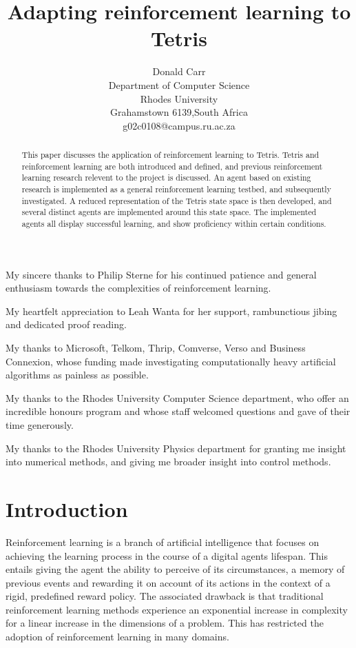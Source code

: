 \documentclass{rucsthesis}
\title{Adapting reinforcement learning to Tetris}
\author{Donald Carr \\ Department of Computer Science \\ Rhodes University \\ Grahamstown 6139,South Africa \\ g02c0108@campus.ru.ac.za}
\begin{document}
\maketitle

\begin{abstract}

This paper discusses the application of reinforcement learning to Tetris. Tetris and reinforcement learning are both introduced and defined, and previous reinforcement learning research relevent to the project is discussed. An agent based on existing research is implemented as a general reinforcement learning testbed, and subsequently investigated. A reduced representation of the Tetris state space is then developed, and several distinct agents are implemented around this state space. The implemented agents all display successful learning, and show proficiency within certain conditions. 

\end{abstract}

\begin{acknowledgements}

My sincere thanks to Philip Sterne for his continued patience and general enthusiasm towards the complexities of reinforcement learning.

My heartfelt appreciation to Leah Wanta for her support, rambunctious jibing and dedicated proof reading. 

My thanks to Microsoft, Telkom, Thrip, Comverse, Verso and Business Connexion, whose funding made investigating computationally heavy artificial algorithms as painless as possible.

My thanks to the Rhodes University Computer Science department, who offer an incredible honours program and whose staff welcomed questions and gave of their time generously.

My thanks to the Rhodes University Physics department for granting me insight into numerical methods, and giving me broader insight into control methods.

\end{acknowledgements}

\tableofcontents
\pagebreak
\listoffigures
\pagebreak
\listoftables
\pagebreak

\chapter{Introduction}

Reinforcement learning is a branch of artificial intelligence that focuses on achieving the learning process in the course of a digital agents lifespan. This entails giving the agent the ability to perceive of its circumstances, a memory of previous events and rewarding it on account of its actions in the context of a rigid, predefined reward policy. The associated drawback is that traditional reinforcement learning methods experience an exponential increase in complexity for a linear increase in the dimensions of a problem. This has restricted the adoption of reinforcement learning in many domains.
\end{document}
